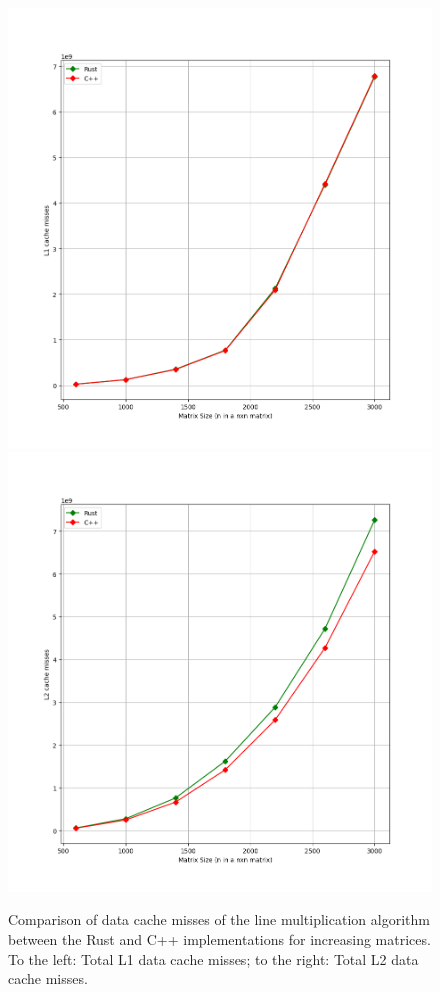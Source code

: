 \documentclass{report}
\begin{document}
			\begin{figure}[H]
				\begin{adjustbox}{center}
					\includegraphics[scale=0.4]{line_l1_cache_misses.png}
					\includegraphics[scale=0.4]{line_l2_cache_misses.png}
				\end{adjustbox}
				\caption{Comparison of data cache misses of the line multiplication algorithm between the Rust and C++ implementations for increasing matrices. To the left: Total L1 data cache misses; to the right: Total L2 data cache misses.}
			\end{figure}
		
\end{document}
